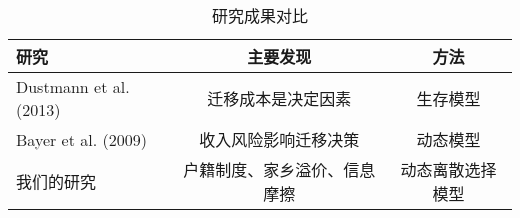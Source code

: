 
\begin{table}[!ht]
\centering
\caption{研究成果对比}
\begin{tabular}{lcc}
\toprule
研究 & 主要发现 & 方法 \\
\midrule
Dustmann et al. (2013) & 迁移成本是决定因素 & 生存模型 \\
Bayer et al. (2009) & 收入风险影响迁移决策 & 动态模型 \\
我们的研究 & 户籍制度、家乡溢价、信息摩擦 & 动态离散选择模型 \\
\bottomrule
\end{tabular}
\label{tab:研究成果对比}
\end{table}
